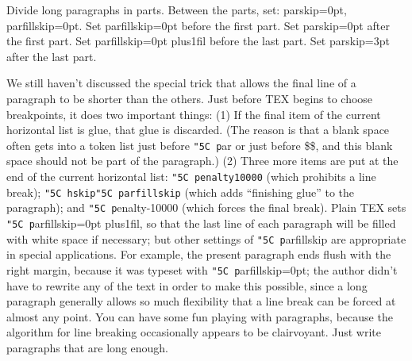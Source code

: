 Divide long paragraphs in parts.
Between the parts, set: parskip=0pt, parfillskip=0pt.
Set parfillskip=0pt before the first part.
Set parskip=0pt after the first part.
Set parfillskip=0pt plus1fil before the last part.
Set parskip=3pt after the last part.


\def\\#1{{\tt \char"5C #1}}
\parfillskip=0pt
We still haven’t discussed the special trick that allows the final line of a
paragraph to be shorter than the others.
Just before TEX begins to choose
breakpoints, it does two important things: (1) If the final item of the current horizontal
list is glue, that glue is discarded. 
(The reason is that a blank space often gets into a
token list just before \\par or just before \$\$, 
and this blank space should not be part
of the paragraph.) 
(2) Three more items are put at the end of the current horizontal
list: \\{penalty10000} (which prohibits a line break); \\{hskip\\parfillskip} (which adds
“finishing glue” to the paragraph);
and \\penalty-10000 (which forces the final break).
Plain TEX sets \\parfillskip=0pt plus1fil,
so that the last line of each paragraph will
be filled with white space if necessary;
but other settings of \\parfillskip are appropriate in special applications.
For example, the present paragraph ends flush with the
right margin, because it was typeset with \\parfillskip=0pt; the author didn’t have to
rewrite any of the text in order to make this possible, since a long paragraph generally
allows so much flexibility that a line break can be forced at almost any point. You
can have some fun playing with paragraphs, because the algorithm for line breaking
occasionally appears to be clairvoyant. Just write paragraphs that are long enough.
\parskip=0pt
\parindent=0pt

